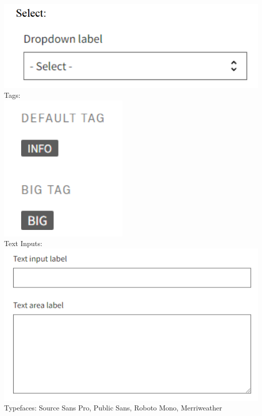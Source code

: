 \documentclass{article}
\begin{document}
\includegraphics{radiobuttons} \\
Tags: \\
\includegraphics{tags} \\
Text Inputs: \\
\includegraphics{text_inputs} \\
Typefaces: Source Sans Pro, Public Sans, Roboto Mono, Merriweather
\end{document}
